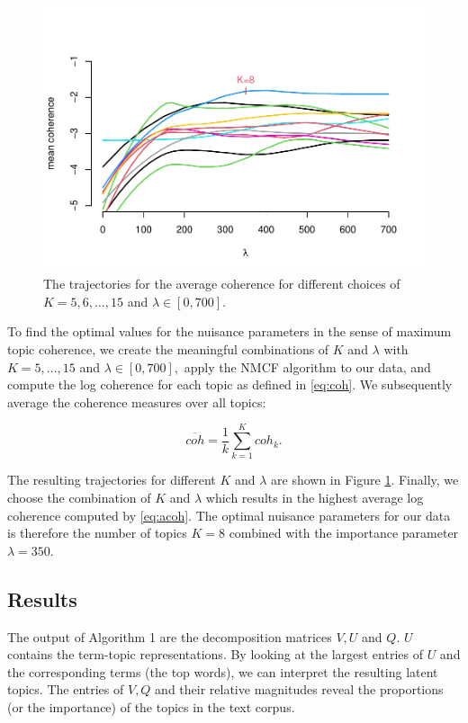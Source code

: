 \documentclass[
]{article}
\begin{document}
\begin{figure}
\includegraphics[width=0.8\linewidth]{20240314_sustain_dim_files/figure-latex/figtraj-1} \caption{The trajectories for the average coherence for different choices of \(K=5,6,\ldots,15\) and \(\lambda\in [0,700]\).}\label{fig:figtraj}
\end{figure}

To find the optimal values for the nuisance parameters in the sense of maximum topic coherence, we create the meaningful combinations of \(K\) and \(\lambda\) with \(K=5,\ldots,15\) and \(\lambda\in[0,700],\) apply the NMCF algorithm to our data, and compute the log coherence for each topic as defined in \eqref{eq:coh}. We subsequently average the coherence measures over all topics:

\begin{equation}
\overline{coh}=\frac 1k \sum_{k=1}^Kcoh_k.\label{eq:acoh}
\end{equation}

The resulting trajectories for different \(K\) and \(\lambda\) are shown in Figure \ref{fig:figtraj}. Finally, we choose the combination of \(K\) and \(\lambda\) which results in the highest average log coherence computed by \eqref{eq:acoh}. The optimal nuisance parameters for our data is therefore the number of topics \(K=8\) combined with the importance parameter \(\lambda=350.\)

\hypertarget{results}{%
\subsection{Results}\label{results}}

The output of Algorithm 1 are the decomposition matrices \(V,U\) and \(Q\). \(U\) contains the term-topic representations. By looking at the largest entries of \(U\) and the corresponding terms (the top words), we can interpret the resulting latent topics. The entries of \(V,Q\) and their relative magnitudes reveal the proportions (or the importance) of the topics in the text corpus.
\end{document}
